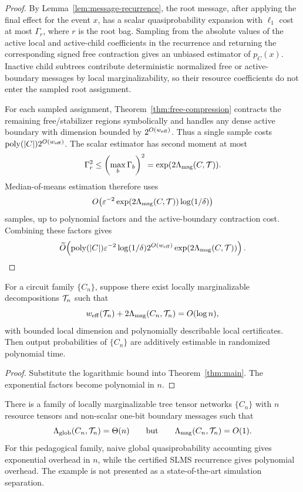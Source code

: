 \begin{proof}
By Lemma~\ref{lem:message-recurrence}, the root message, after applying the final effect for the event \(x\), has a scalar quasiprobability expansion with \(\ell_1\) cost at most \(\Gamma_r\), where \(r\) is the root bag. Sampling from the absolute values of the active local and active-child coefficients in the recurrence and returning the corresponding signed free contraction gives an unbiased estimator of \(p_C(x)\). Inactive child subtrees contribute deterministic normalized free or active-boundary messages by local marginalizability, so their resource coefficients do not enter the sampled root assignment.

For each sampled assignment, Theorem~\ref{thm:free-compression} contracts the remaining free/stabilizer regions symbolically and handles any dense active boundary with dimension bounded by \(2^{O(w_{\mathrm{eff}})}\). Thus a single sample costs \(\operatorname{poly}(|C|)2^{O(w_{\mathrm{eff}})}\). The scalar estimator has second moment at most
\[
\Gamma_r^2\le \left(\max_b\Gamma_b\right)^2
=\exp(2\Lambda_{\mathrm{msg}}(C,\mathcal{T})).
\]
Median-of-means estimation therefore uses
\[
O\!\left(\varepsilon^{-2}\exp(2\Lambda_{\mathrm{msg}}(C,\mathcal{T}))\log(1/\delta)\right)
\]
samples, up to polynomial factors and the active-boundary contraction cost. Combining these factors gives
\[
\widetilde{O}\!\left(
\operatorname{poly}(|C|)\varepsilon^{-2}\log(1/\delta)
2^{O(w_{\mathrm{eff}})}
\exp(2\Lambda_{\mathrm{msg}}(C,\mathcal{T}))
\right).
\]
\end{proof}

\begin{corollary}
\label{cor:poly}
For a circuit family \(\{C_n\}\), suppose there exist locally marginalizable decompositions \(\mathcal{T}_n\) such that
\[
w_{\mathrm{eff}}(\mathcal{T}_n)+2\Lambda_{\mathrm{msg}}(C_n,\mathcal{T}_n)=O(\log n),
\]
with bounded local dimension and polynomially describable local certificates. Then output probabilities of \(\{C_n\}\) are additively estimable in randomized polynomial time.
\end{corollary}

\begin{proof}
Substitute the logarithmic bound into Theorem~\ref{thm:main}. The exponential factors become polynomial in \(n\).
\end{proof}

\begin{example}
\label{prop:improvement}
There is a family of locally marginalizable tree tensor networks \(\{C_n\}\) with \(n\) resource tensors and non-scalar one-bit boundary messages such that
\[
\Lambda_{\mathrm{glob}}(C_n,\mathcal{T}_n)=\Theta(n)
\qquad\text{but}\qquad
\Lambda_{\mathrm{msg}}(C_n,\mathcal{T}_n)=O(1).
\]
For this pedagogical family, naive global quasiprobability accounting gives exponential overhead in \(n\), while the certified SLMS recurrence gives polynomial overhead. The example is not presented as a state-of-the-art simulation separation.
\end{example}

